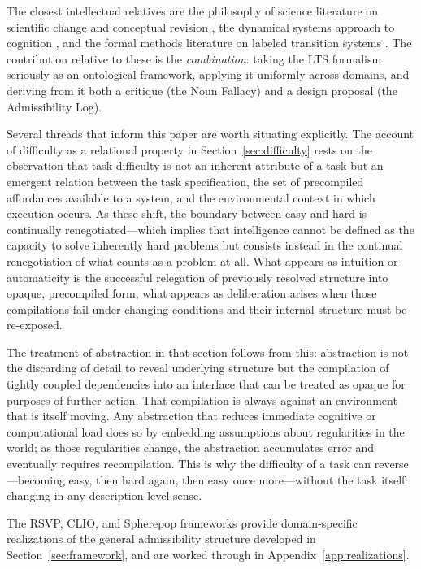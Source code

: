 \documentclass[12pt, a4paper]{article}
\theoremstyle{plain}
\theoremstyle{definition}
\theoremstyle{remark}
\begin{document}
The closest intellectual relatives are the philosophy of science literature
on scientific change and conceptual revision \citep{kuhn1962,laudan1977},
the dynamical systems approach to cognition \citep{thelen1994,beer2000},
and the formal methods literature on labeled transition systems
\citep{milner1989,hoare1985}. The contribution relative to these is the
\emph{combination}: taking the LTS formalism seriously as an ontological
framework, applying it uniformly across domains, and deriving from it both
a critique (the Noun Fallacy) and a design proposal (the Admissibility Log).

Several threads that inform this paper are worth situating explicitly.
The account of difficulty as a relational property in Section~\ref{sec:difficulty}
rests on the observation that task difficulty is not an inherent attribute of
a task but an emergent relation between the task specification, the set of
precompiled affordances available to a system, and the environmental context
in which execution occurs. As these shift, the boundary between easy and hard
is continually renegotiated---which implies that intelligence cannot be defined
as the capacity to solve inherently hard problems but consists instead in
the continual renegotiation of what counts as a problem at all. What appears
as intuition or automaticity is the successful relegation of previously resolved
structure into opaque, precompiled form; what appears as deliberation arises
when those compilations fail under changing conditions and their internal
structure must be re-exposed.

The treatment of abstraction in that section follows from this: abstraction is
not the discarding of detail to reveal underlying structure but the compilation
of tightly coupled dependencies into an interface that can be treated as opaque
for purposes of further action. That compilation is always against an environment
that is itself moving. Any abstraction that reduces immediate cognitive or
computational load does so by embedding assumptions about regularities in the
world; as those regularities change, the abstraction accumulates error and
eventually requires recompilation. This is why the difficulty of a task can
reverse---becoming easy, then hard again, then easy once more---without the
task itself changing in any description-level sense.

The RSVP, CLIO, and Spherepop frameworks provide domain-specific realizations
of the general admissibility structure developed in Section~\ref{sec:framework},
and are worked through in Appendix~\ref{app:realizations}.
\end{document}
